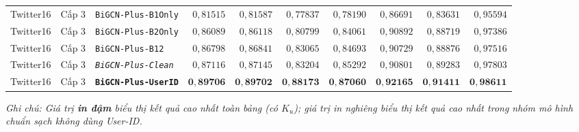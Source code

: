 \documentclass[11pt,a4paper]{extreport}
\begin{document}
\begin{table}[htbp]
\begin{tabular}{@{}lllrrrrrrr@{}}
        Twitter16 & Cấp 3 & \texttt{BiGCN-Plus-B1Only} & $0{,}81515$ & $0{,}81587$ & $0{,}77837$ & $0{,}78190$ & $0{,}86691$ & $0{,}83631$ & $0{,}95594$ \\
        Twitter16 & Cấp 3 & \texttt{BiGCN-Plus-B2Only} & $0{,}86089$ & $0{,}86118$ & $0{,}80799$ & $0{,}84061$ & $0{,}90892$ & $0{,}88719$ & $0{,}97386$ \\
        Twitter16 & Cấp 3 & \texttt{BiGCN-Plus-B12}    & $0{,}86798$ & $0{,}86841$ & $0{,}83065$ & $0{,}84693$ & $0{,}90729$ & $0{,}88876$ & $0{,}97516$ \\
        Twitter16 & Cấp 3 & \textit{\texttt{BiGCN-Plus-Clean}}  & $\mathit{0{,}87116}$ & $\mathit{0{,}87145}$ & $\mathit{0{,}83204}$ & $\mathit{0{,}85292}$ & $\mathit{0{,}90801}$ & $\mathit{0{,}89283}$ & $\mathit{0{,}97803}$ \\
        Twitter16 & Cấp 3 & \textbf{\texttt{BiGCN-Plus-UserID}} & $\mathbf{0{,}89706}$ & $\mathbf{0{,}89702}$ & $\mathbf{0{,}88173}$ & $\mathbf{0{,}87060}$ & $\mathbf{0{,}92165}$ & $\mathbf{0{,}91411}$ & $\mathbf{0{,}98611}$ \\
        \bottomrule
    \end{tabular}
    \par\vspace{3pt}
    {\footnotesize\textit{Ghi chú: Giá trị \textbf{in đậm} biểu thị kết quả cao nhất toàn bảng (có $K_u$); giá trị \textit{in nghiêng} biểu thị kết quả cao nhất trong nhóm mô hình chuẩn sạch không dùng User-ID.}}
\end{table}
\end{document}
